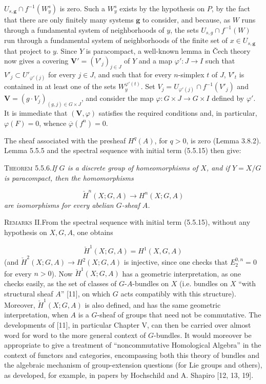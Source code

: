 \clearpage
{}

\noindent $U_{s,\mathbf g}\cap f^{-1}(W^s_y)$ is zero. Such a $W^s_y$ exists
by the hypothesis on $P$, by the fact that there are only finitely many
systems $\mathbf g$ to consider, and because, as $W$ runs through a
fundamental system of neighborhoods of $y$, the sets
$U_{s,g}\cap f^{-1}(W)$ run through a fundamental system of
neighborhoods of the finite set of $x\in U_{s,\mathbf g}$ that project to $y$.
Since $Y$ is paracompact, a well-known lemma in Čech theory now gives a
covering ${\mathbf V}'=(V'_j)_{j\in J}$ of $Y$ and a map
$\varphi':J\to I$ such that $V'_j\subset U'_{\varphi'(j)}$ for every $j\in J$,
and such that for every $n$-simplex $t$ of $J$, $V'_t$ is contained in at
least one of the sets $W_y^{\varphi'(t)}$. Set
$V_j=U_{\varphi'(j)}\cap f^{-1}(V'_j)$ and
${\mathbf V}=(g\cdot V_j)_{(g,j)\in G\times J}$, and consider the map
$\varphi:G\times J\to G\times I$ defined by $\varphi'$. It is immediate that
$({\mathbf V},\varphi)$ satisfies the required conditions and, in particular,
$\varphi(F)=0$, whence $\overline\varphi(f^n)=0$.

The sheaf associated with the presheaf $H^q(A)$, for $q>0$, is zero (Lemma
3.8.2). Lemma 5.5.5 and the spectral sequence with initial term (5.5.15) then
give:

\textsc{Theorem 5.5.6.}\quad \textit{If $G$ is a discrete group of
homeomorphisms of $X$, and if $Y=X/G$ is paracompact, then the homomorphisms}

\[
\tag{5.5.14}
\check H^n(X;G,A)\to H^n(X;G,A)
\]
\textit{are isomorphisms for every abelian $G$-sheaf $A$.}

\textsc{Remarks II.}\quad From the spectral sequence with initial
term (5.5.15), without any hypothesis on $X,G,A$, one obtains

\[
\check H^1(X;G,A)=H^1(X,G,A)
\]
 (and $\check H^2(X;G,A)\to H^2(X;G,A)$ is injective, since one
checks that $E_2^{0,n}=0$ for every $n>0$).
Now $\check H^1(X;G,A)$ has a geometric interpretation, as one checks
easily, as the set of classes of $G$-$A$-bundles on $X$ (i.e. bundles on $X$
``with structural sheaf $A$'' [11], on which $G$ acts compatibly with this
structure). Moreover, $\check H^1(X;G,A)$ is also defined, and has the same
geometric interpretation, when $A$ is a $G$-sheaf of groups that need not be
commutative. The developments of [11], in particular Chapter V, can then be
carried over almost word for word to the more general context of $G$-bundles.
It would moreover be appropriate to give a treatment of ``noncommutative
Homological Algebra'' in the context of functors and categories, encompassing
both this theory of bundles and the algebraic mechanism of group-extension
questions (for Lie groups and others), as developed, for example, in papers
by Hochschild and A. Shapiro [12, 13, 19].

